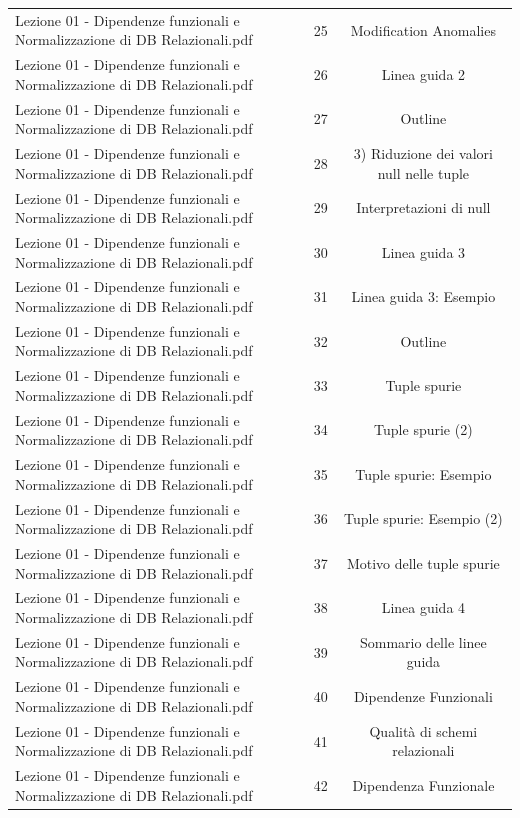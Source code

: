 \documentclass[11pt]{article}
\begin{document}
\begin{longtable}{@{}p{}cc@{}}
Lezione 01 - Dipendenze funzionali e Normalizzazione di DB Relazionali.pdf & 25 & Modification Anomalies \\
Lezione 01 - Dipendenze funzionali e Normalizzazione di DB Relazionali.pdf & 26 & Linea guida 2 \\
Lezione 01 - Dipendenze funzionali e Normalizzazione di DB Relazionali.pdf & 27 & Outline \\
Lezione 01 - Dipendenze funzionali e Normalizzazione di DB Relazionali.pdf & 28 & 3) Riduzione dei valori null nelle tuple \\
Lezione 01 - Dipendenze funzionali e Normalizzazione di DB Relazionali.pdf & 29 & Interpretazioni di null \\
Lezione 01 - Dipendenze funzionali e Normalizzazione di DB Relazionali.pdf & 30 & Linea guida 3 \\
Lezione 01 - Dipendenze funzionali e Normalizzazione di DB Relazionali.pdf & 31 & Linea guida 3: Esempio \\
Lezione 01 - Dipendenze funzionali e Normalizzazione di DB Relazionali.pdf & 32 & Outline \\
Lezione 01 - Dipendenze funzionali e Normalizzazione di DB Relazionali.pdf & 33 & Tuple spurie \\
Lezione 01 - Dipendenze funzionali e Normalizzazione di DB Relazionali.pdf & 34 & Tuple spurie (2) \\
Lezione 01 - Dipendenze funzionali e Normalizzazione di DB Relazionali.pdf & 35 & Tuple spurie: Esempio \\
Lezione 01 - Dipendenze funzionali e Normalizzazione di DB Relazionali.pdf & 36 & Tuple spurie: Esempio (2) \\
Lezione 01 - Dipendenze funzionali e Normalizzazione di DB Relazionali.pdf & 37 & Motivo delle tuple spurie \\
Lezione 01 - Dipendenze funzionali e Normalizzazione di DB Relazionali.pdf & 38 & Linea guida 4 \\
Lezione 01 - Dipendenze funzionali e Normalizzazione di DB Relazionali.pdf & 39 & Sommario delle linee guida \\
Lezione 01 - Dipendenze funzionali e Normalizzazione di DB Relazionali.pdf & 40 & Dipendenze Funzionali \\
Lezione 01 - Dipendenze funzionali e Normalizzazione di DB Relazionali.pdf & 41 & Qualità di schemi relazionali \\
Lezione 01 - Dipendenze funzionali e Normalizzazione di DB Relazionali.pdf & 42 & Dipendenza Funzionale \\

\end{longtable}
\end{document}
